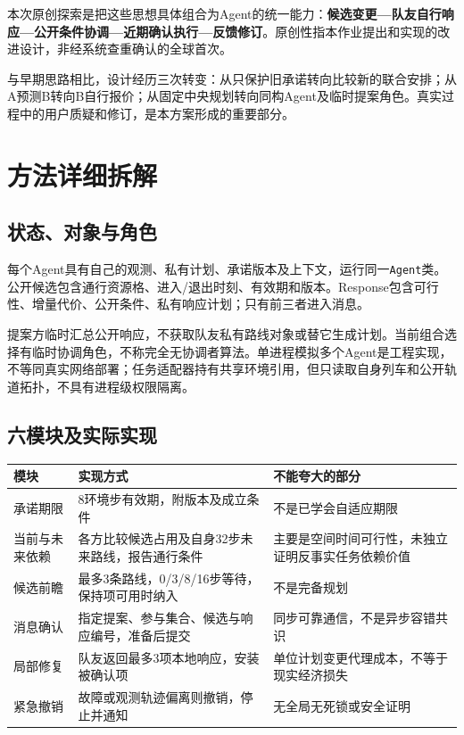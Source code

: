 本次原创探索是把这些思想具体组合为Agent的统一能力：\textbf{候选变更---队友自行响应---公开条件协调---近期确认执行---反馈修订}。原创性指本作业提出和实现的改进设计，非经系统查重确认的全球首次。

与早期思路相比，设计经历三次转变：从只保护旧承诺转向比较新的联合安排；从A预测B转向B自行报价；从固定中央规划转向同构Agent及临时提案角色。真实过程中的用户质疑和修订，是本方案形成的重要部分。

\hypertarget{ux65b9ux6cd5ux8be6ux7ec6ux62c6ux89e3}{%
\chapter{方法详细拆解}\label{ux65b9ux6cd5ux8be6ux7ec6ux62c6ux89e3}}

\hypertarget{ux72b6ux6001ux5bf9ux8c61ux4e0eux89d2ux8272}{%
\section{状态、对象与角色}\label{ux72b6ux6001ux5bf9ux8c61ux4e0eux89d2ux8272}}

每个Agent具有自己的观测、私有计划、承诺版本及上下文，运行同一\passthrough{\lstinline!Agent!}类。公开候选包含通行资源格、进入/退出时刻、有效期和版本。Response包含可行性、增量代价、公开条件、私有响应计划；只有前三者进入消息。

提案方临时汇总公开响应，不获取队友私有路线对象或替它生成计划。当前组合选择有临时协调角色，不称完全无协调者算法。单进程模拟多个Agent是工程实现，不等同真实网络部署；任务适配器持有共享环境引用，但只读取自身列车和公开轨道拓扑，不具有进程级权限隔离。

\hypertarget{ux516dux6a21ux5757ux53caux5b9eux9645ux5b9eux73b0}{%
\section{六模块及实际实现}\label{ux516dux6a21ux5757ux53caux5b9eux9645ux5b9eux73b0}}

\begin{longtable}[]{@{}lll@{}}
\toprule
模块 & 实现方式 & 不能夸大的部分 \\
\midrule
\endhead
承诺期限 & 8环境步有效期，附版本及成立条件 & 不是已学会自适应期限 \\
当前与未来依赖 & 各方比较候选占用及自身32步未来路线，报告通行条件 &
主要是空间时间可行性，未独立证明反事实任务依赖价值 \\
候选前瞻 & 最多3条路线，0/3/8/16步等待，保持项可用时纳入 & 不是完备规划 \\
消息确认 & 指定提案、参与集合、候选与响应编号，准备后提交 &
同步可靠通信，不是异步容错共识 \\
局部修复 & 队友返回最多3项本地响应，安装被确认项 &
单位计划变更代理成本，不等于现实经济损失 \\
紧急撤销 & 故障或观测轨迹偏离则撤销，停止并通知 & 无全局无死锁或安全证明 \\
\bottomrule
\end{longtable}

